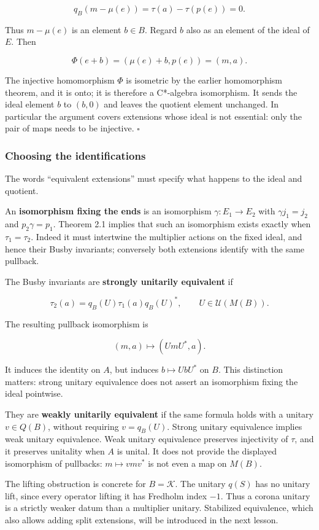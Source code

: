 \documentclass[
  11pt,
]{article}
\begin{document}
\[
q_B(m-\mu(e))=\tau(a)-\tau(p(e))=0.
\]

Thus \(m-\mu(e)\) is an element \(b\in B\). Regard \(b\) also as an
element of the ideal of \(E\). Then

\[
\Phi(e+b)=(\mu(e)+b,p(e))=(m,a).
\]

The injective homomorphism \(\Phi\) is isometric by the earlier
homomorphism theorem, and it is onto; it is therefore a C*-algebra
isomorphism. It sends the ideal element \(b\) to \((b,0)\) and leaves
the quotient element unchanged. In particular the argument covers
extensions whose ideal is not essential: only the pair of maps needs to
be injective. \(\square\)

\subsubsection{Choosing the
identifications}\label{choosing-the-identifications}

The words ``equivalent extensions'' must specify what happens to the
ideal and quotient.

An \textbf{isomorphism fixing the ends} is an isomorphism
\(\gamma:E_1\to E_2\) with \(\gamma j_1=j_2\) and \(p_2\gamma=p_1\).
Theorem 2.1 implies that such an isomorphism exists exactly when
\(\tau_1=\tau_2\). Indeed it must intertwine the multiplier actions on
the fixed ideal, and hence their Busby invariants; conversely both
extensions identify with the same pullback.

The Busby invariants are \textbf{strongly unitarily equivalent} if

\[
\tau_2(a)=q_B(U)\tau_1(a)q_B(U)^*,
\qquad U\in\mathcal U(M(B)).
\]

The resulting pullback isomorphism is

\[
(m,a)\longmapsto(UmU^*,a).
\]

It induces the identity on \(A\), but induces \(b\mapsto UbU^*\) on
\(B\). This distinction matters: strong unitary equivalence does not
assert an isomorphism fixing the ideal pointwise.

They are \textbf{weakly unitarily equivalent} if the same formula holds
with a unitary \(v\in Q(B)\), without requiring \(v=q_B(U)\). Strong
unitary equivalence implies weak unitary equivalence. Weak unitary
equivalence preserves injectivity of \(\tau\), and it preserves
unitality when \(A\) is unital. It does not provide the displayed
isomorphism of pullbacks: \(m\mapsto vmv^*\) is not even a map on
\(M(B)\).

The lifting obstruction is concrete for \(B=\mathcal K\). The unitary
\(q(S)\) has no unitary lift, since every operator lifting it has
Fredholm index \(-1\). Thus a corona unitary is a strictly weaker datum
than a multiplier unitary. Stabilized equivalence, which also allows
adding split extensions, will be introduced in the next lesson.
\end{document}
